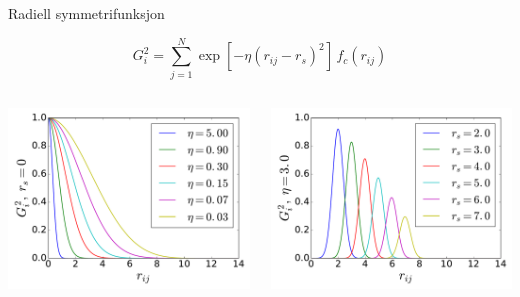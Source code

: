 \documentclass{beamer}
\begin{document}
\begin{frame}{Radiell symmetrifunksjon}

\begin{equation*}
 G_i^2 = \sum_{j=1}^N \exp[-\eta(r_{ij}-r_s)^2] \,f_c(r_{ij})
\end{equation*}

\begin{columns} %
  \begin{column}{0.5\linewidth} %
   \centering
   \includegraphics[width=\linewidth]{../Figures/Presentation/G2_1.pdf}
  \end{column}
  \begin{column}{0.5\linewidth} %
   \centering
   \includegraphics[width=\linewidth]{../Figures/Presentation/G2_2.pdf}
  \end{column}
\end{columns}

\end{frame}
\end{document}
